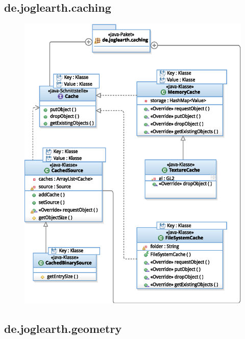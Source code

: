 \documentclass[10pt]{scrreprt}
\begin{document}
\begin{figure}[!htb]
\begin{minipage}[c]{6cm}
        \end{minipage}
\end{figure}

\newpage

\subsection*{de.joglearth.caching}

\begin{figure}[!htb]
\begin{center}
	\includegraphics[scale=0.55]{de_joglearth_caching.eps}
\end{center}
\end{figure}

\newpage

\subsection*{de.joglearth.geometry}
\end{document}
